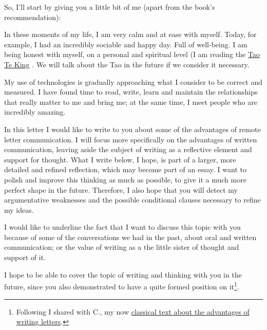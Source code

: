 \documentclass[]{book}
\let\rmarkdownfootnote\footnote%
\def\footnote{\protect\rmarkdownfootnote}
\begin{document}
So, I'll start by giving you a little bit of me (apart from the book's recommendation):

In these moments of my life, I am very calm and at ease with myself. Today, for example, I had an incredibly sociable and happy day. Full of well-being. I am being honest with myself, on a personal and spiritual level (I am reading the \href{https://en.wikipedia.org/wiki/Tao_Te_Ching}{Tao Te King} \citep{ta1984tao}. We will talk about the Tao in the future if we consider it necessary.

My use of technologies is gradually approaching what I consider to be correct and measured. I have found time to read, write, learn and maintain the relationships that really matter to me and bring me; at the same time, I meet people who are incredibly amazing.

In this letter I would like to write to you about some of the advantages of remote letter communication. I will focus more specifically on the advantages of written communication, leaving aside the subject of writing as a reflective element and support for thought. What I write below, I hope, is part of a larger, more detailed and refined reflection, which may become part of an essay. I want to polish and improve this thinking as much as possible, to give it a much more perfect shape in the future. Therefore, I also hope that you will detect my argumentative weaknesses and the possible conditional clauses necessary to refine my ideas.

I would like to underline the fact that I want to discuss this topic with you because of some of the conversations we had in the past, about oral and written communication; or the value of writing as a the little sister of thought and support of it.

I hope to be able to cover the topic of writing and thinking with you in the future, since you also demonstrated to have a quite formed position on it\footnote{Following I shared with C., my now \href{https://www.carlitofluitoideas.com/writing-letters/}{classical text about the advantages of writing letters}.}.
\end{document}
